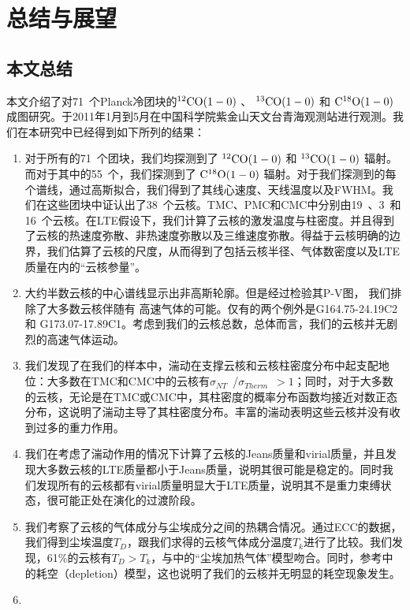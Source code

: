\documentclass[UTF8, nocolorlinks]{pkuthss}
\newcommand{\coaa}{$\rm^{12}CO(1-0)$ }
\newcommand{\cobb}{$\rm^{13}CO(1-0)$ }
\newcommand{\cocc}{$\rm C^{18}O(1-0)$ }
\newcommand{\sigmath}{$\sigma _{Therm}$\ }
\newcommand{\sigmant}{$\sigma _{NT}$\ }
\newcommand{\numsou}{71\ }
\newcommand{\numcore}{38\ }
\newcommand{\numcoretmc}{19\ }
\newcommand{\numcorepmc}{3\ }
\newcommand{\numcorecmc}{16\ }
\newcommand{\numcocc}{55\ }
\begin{document}
\chapter{总结与展望}
		
	\section{本文总结}

		本文介绍了对\numsou 个Planck冷团块的\coaa 、 \cobb 和 \cocc 成图研究。于2011年1月到5月在中国科学院紫金山天文台青海观测站进行观测。我们在本研究中已经得到如下所列的结果：
	    \begin{enumerate}
	     \item 
	     	对于所有的\numsou 个团块，我们均探测到了 \coaa 和 \cobb 辐射。而对于其中的\numcocc 个，我们探测到了 \cocc 辐射。对于我们探测到的每个谱线，通过高斯拟合，我们得到了其线心速度、天线温度以及FWHM。我们在这些团块中证认出了\numcore 个云核。TMC、PMC和CMC中分别由\numcoretmc 、\numcorepmc 和\numcorecmc 个云核。在LTE假设下，我们计算了云核的激发温度与柱密度。并且得到了云核的热速度弥散、非热速度弥散以及三维速度弥散。得益于云核明确的边界，我们估算了云核的尺度，从而得到了包括云核半径、气体数密度以及LTE质量在内的“云核参量”。
	     \item
	     	大约半数云核的中心谱线显示出非高斯轮廓。但是经过检验其P-V图， 我们排除了大多数云核伴随有 高速气体的可能。仅有的两个例外是G164.75-24.19C2 和 G173.07-17.89C1。考虑到我们的云核总数，总体而言，我们的云核并无剧烈的高速气体运动。
	    \item 
	    	我们发现了在我们的样本中，湍动在支撑云核和云核柱密度分布中起支配地位：大多数在TMC和CMC中的云核有\sigmant/\sigmath$>1$；同时，对于大多数的云核，无论是在TMC或CMC中，其柱密度的概率分布函数均接近对数正态分布，这说明了湍动主导了其柱密度分布。丰富的湍动表明这些云核并没有收到过多的重力作用。
	    \item 
	    	我们在考虑了湍动作用的情况下计算了云核的Jeans质量和virial质量，并且发现大多数云核的LTE质量都小于Jeans质量，说明其很可能是稳定的。同时我们发现所有的云核都有virial质量明显大于LTE质量，说明其不是重力束缚状态，很可能正处在演化的过渡阶段。
	    \item
	    	我们考察了云核的气体成分与尘埃成分之间的热耦合情况。通过ECC的数据，我们得到尘埃温度$T_D$，跟我们求得的云核气体成分温度$T_k$进行了比较。我们发现，61\%的云核有$T_D>T_k$，与\parencite{1974ApJ...189..441G}中的“尘埃加热气体”模型吻合。同时，参考\parencite{2001ApJ...557..736G}中的耗空（depletion）模型，这也说明了我们的云核并无明显的耗空现象发生。
	    \item

\end{enumerate}
\end{document}
